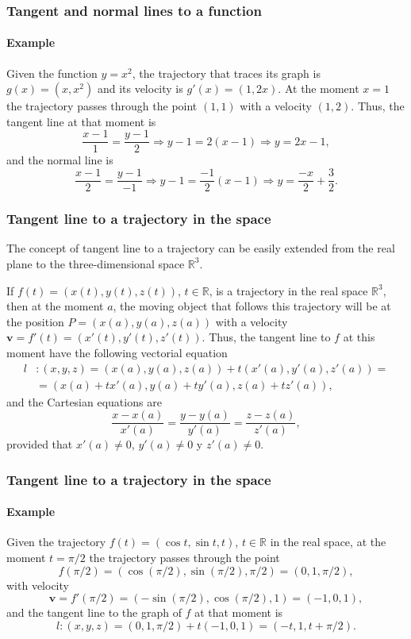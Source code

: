 \begin{frame}
\frametitle{Tangent and normal lines to a function}
\framesubtitle{Example}
Given the function $y=x^2$, the trajectory that traces its graph is $g(x)=(x,x^2)$ and its velocity is
$g'(x)=(1,2x)$. At the moment $x=1$ the trajectory passes through the point $(1,1)$ with a velocity $(1,2)$.
Thus, the tangent line at that moment is
\[
\frac{x-1}{1} = \frac{y-1}{2} \Rightarrow y-1 = 2(x-1) \Rightarrow y = 2x-1,
\]
and the normal line is
\[
\frac{x-1}{2} = \frac{y-1}{-1} \Rightarrow y-1 = \frac{-1}{2}(x-1) \Rightarrow y = \frac{-x}{2}+\frac{3}{2}.
\]
\begin{center}

\end{center}
\end{frame}


\begin{frame}
\frametitle{Tangent line to a trajectory in the space}
The concept of tangent line to a trajectory can be easily extended from the real plane to the three-dimensional space $\mathbb{R}^3$.

If $f(t)=(x(t),y(t),z(t))$, $t\in \mathbb{R}$, is a trajectory in the real space $\mathbb{R}^3$, then at the moment $a$, the moving object that follows this trajectory will be at the position $P=(x(a),y(a),z(a))$ with a velocity $\mathbf{v}=f'(t)=(x'(t),y'(t),z'(t))$.
Thus, the tangent line to $f$ at this moment have the following vectorial equation
\begin{align*}
l&: (x,y,z)=(x(a),y(a),z(a))+t(x'(a),y'(a),z'(a)) =\\
&= (x(a)+tx'(a),y(a)+ty'(a),z(a)+tz'(a)),
\end{align*}
and the Cartesian equations are
\[
\frac{x-x(a)}{x'(a)}=\frac{y-y(a)}{y'(a)}=\frac{z-z(a)}{z'(a)},
\]
provided that $x'(a)\neq 0$, $y'(a)\neq 0$ y $z'(a)\neq 0$.
\end{frame}


\begin{frame}
\frametitle{Tangent line to a trajectory in the space}
\framesubtitle{Example}
Given the trajectory $f(t)=(\cos t, \sin t, t)$, $t\in \mathbb{R}$ in the real space, at the moment $t=\pi/2$ the trajectory passes through the point
\[
f(\pi/2)=(\cos(\pi/2),\sin(\pi/2),\pi/2)=(0,1,\pi/2),
\]
with velocity
\[
\mathbf{v}=f'(\pi/2)=(-\sin(\pi/2),\cos(\pi/2), 1)=(-1,0,1),
\]
and the tangent line to the graph of $f$ at that moment is
\[
l:(x,y,z)=(0,1,\pi/2)+t(-1,0,1) = (-t,1,t+\pi/2).
\]
\begin{center}

\end{center}
\end{frame}


